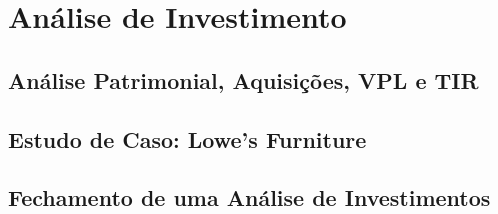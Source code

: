 \chapter{Análise de Investimento}
\section{Análise Patrimonial, Aquisições, VPL e TIR}

\section{Estudo de Caso: Lowe's Furniture}

\section{Fechamento de uma Análise de Investimentos}
